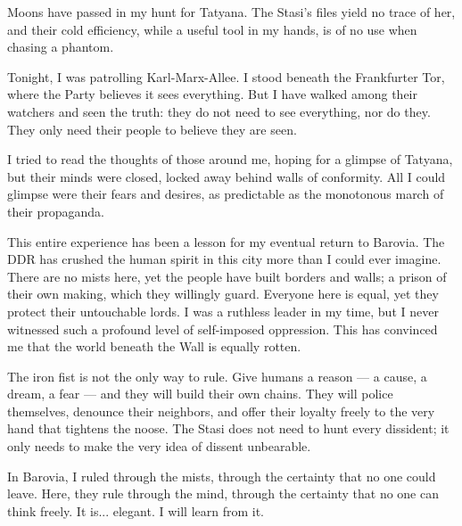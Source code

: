 
Moons have passed in my hunt for Tatyana.
The Stasi's files yield no trace of her, and their cold efficiency, while a useful tool in my hands, is of no use when chasing a phantom.

Tonight, I was patrolling Karl-Marx-Allee.
I stood beneath the Frankfurter Tor, where the Party believes it sees everything.
But I have walked among their watchers and seen the truth: they do not need to see everything, nor do they.
They only need their people to believe they are seen.

I tried to read the thoughts of those around me, hoping for a glimpse of Tatyana, but their minds were closed, locked away behind walls of conformity.
All I could glimpse were their fears and desires, as predictable as the monotonous march of their propaganda.

This entire experience has been a lesson for my eventual return to Barovia.
The DDR has crushed the human spirit in this city more than I could ever imagine.
There are no mists here, yet the people have built borders and walls; a prison of their own making, which they willingly guard.
Everyone here is equal, yet they protect their untouchable lords.
I was a ruthless leader in my time, but I never witnessed such a profound level of self-imposed oppression.
This has convinced me that the world beneath the Wall is equally rotten.

The iron fist is not the only way to rule.
Give humans a reason — a cause, a dream, a fear — and they will build their own chains.
They will police themselves, denounce their neighbors, and offer their loyalty freely to the very hand that tightens the noose.
The Stasi does not need to hunt every dissident; it only needs to make the very idea of dissent unbearable.

In Barovia, I ruled through the mists, through the certainty that no one could leave.
Here, they rule through the mind, through the certainty that no one can think freely.
It is... elegant.
I will learn from it.

\vfill\newpage
